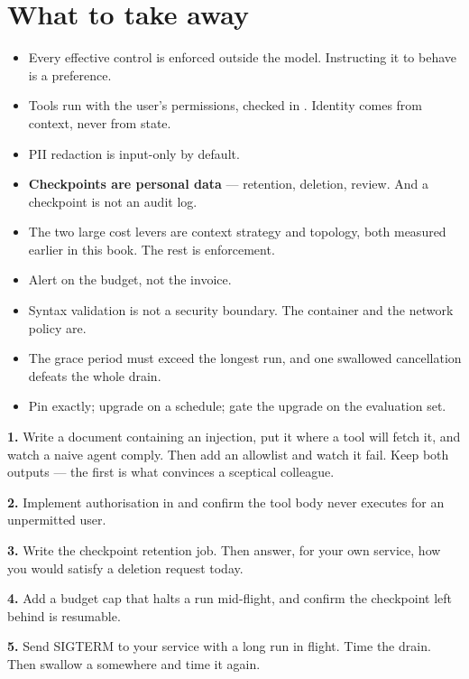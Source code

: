 \section{What to take away}
\label{sec:ch15-summary}

\begin{itemize}[leftmargin=1.4em]
\item Every effective control is enforced outside the model. Instructing it to
      behave is a preference.
\item Tools run with the user's permissions, checked in .
      Identity comes from context, never from state.
\item PII redaction is input-only by default.
\item \textbf{Checkpoints are personal data} --- retention, deletion, review.
      And a checkpoint is not an audit log.
\item The two large cost levers are context strategy and topology, both measured
      earlier in this book. The rest is enforcement.
\item Alert on the budget, not the invoice.
\item Syntax validation is not a security boundary. The container and the network
      policy are.
\item The grace period must exceed the longest run, and one swallowed
      cancellation defeats the whole drain.
\item Pin exactly; upgrade on a schedule; gate the upgrade on the evaluation set.
\end{itemize}

\begin{exercisebox}
\textbf{1.} Write a document containing an injection, put it where a tool will
fetch it, and watch a naive agent comply. Then add an allowlist and watch it
fail. Keep both outputs --- the first is what convinces a sceptical colleague.

\textbf{2.} Implement authorisation in  and confirm the
tool body never executes for an unpermitted user.

\textbf{3.} Write the checkpoint retention job. Then answer, for your own
service, how you would satisfy a deletion request today.

\textbf{4.} Add a budget cap that halts a run mid-flight, and confirm the
checkpoint left behind is resumable.

\textbf{5.} Send SIGTERM to your service with a long run in flight. Time the
drain. Then swallow a  somewhere and time it again.
\end{exercisebox}

